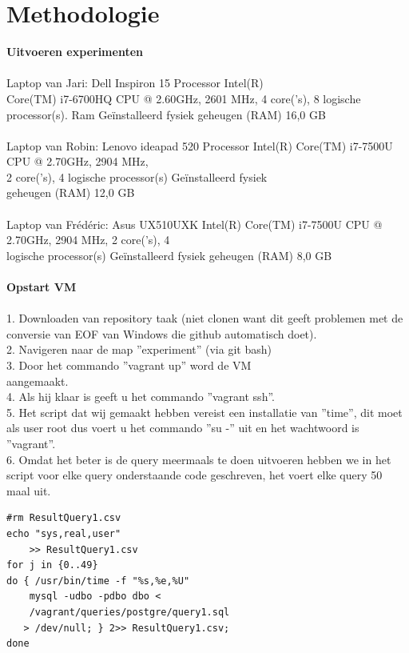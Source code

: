 \documentclass[fleqn,10pt]{artikeltin}
\begin{document}
\section{Methodologie}
\label{sec:methodologie}

\textbf{Uitvoeren experimenten}\\\\
Laptop van Jari: Dell Inspiron 15 
Processor Intel(R)\\Core(TM) i7-6700HQ CPU @ 2.60GHz, 2601 MHz, 4 core('s), 8 logische processor(s). 
Ram Geïnstalleerd fysiek geheugen (RAM)	16,0 GB\\\\
Laptop van Robin: Lenovo ideapad 520
Processor Intel(R) Core(TM) i7-7500U CPU @ 2.70GHz, 2904 MHz,\\ 2 core('s), 4 logische processor(s)
Geïnstalleerd fysiek \\geheugen (RAM)	12,0 GB\\\\
Laptop van Frédéric: Asus UX510UXK
Intel(R) Core(TM) i7-7500U CPU @ 2.70GHz, 2904 MHz, 2 core('s), 4 \\logische processor(s)
Geïnstalleerd fysiek geheugen (RAM)	8,0 GB\\\\
\textbf{Opstart VM}\\\\
1. Downloaden van repository taak (niet clonen want dit geeft problemen met de conversie van EOF van Windows die github automatisch doet).\\
2. Navigeren naar de map ''experiment'' (via git bash)\\
3. Door het commando ''vagrant up'' word de VM \\aangemaakt.\\
4. Als hij klaar is geeft u het commando ''vagrant ssh''.\\
5. Het script dat wij gemaakt hebben vereist een installatie van ''time'', dit moet als user root dus voert u het commando ''su -'' uit en het wachtwoord is ''vagrant''.\\
6. Omdat het beter is de query meermaals te doen uitvoeren hebben we in het script voor elke query onderstaande code geschreven, het voert elke query 50 maal uit.
\begin{lstlisting}
#rm ResultQuery1.csv
echo "sys,real,user"
    >> ResultQuery1.csv
for j in {0..49}
do { /usr/bin/time -f "%s,%e,%U"
    mysql -udbo -pdbo dbo < 
    /vagrant/queries/postgre/query1.sql
   > /dev/null; } 2>> ResultQuery1.csv;
done
\end{lstlisting}
\end{document}
